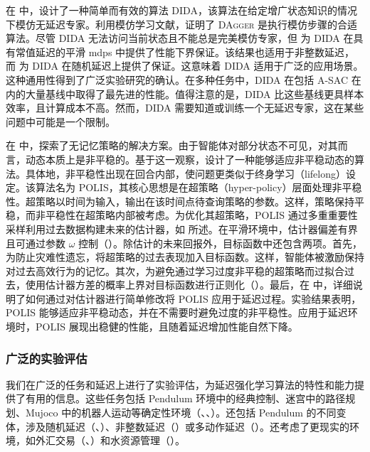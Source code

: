 在  中，设计了一种简单而有效的算法 DIDA，该算法在给定增广状态知识的情况下模仿无延迟专家。利用模仿学习文献，证明了 \textsc{DAgger} 是执行模仿步骤的合适算法。尽管 DIDA 无法访问当前状态且不能总是完美模仿专家，但  为 DIDA 在具有常值延迟的平滑 \glspl{mdp} 中提供了性能下界保证。该结果也适用于非整数延迟，而  为 DIDA 在随机延迟上提供了保证。这意味着 DIDA 适用于广泛的应用场景。这种通用性得到了广泛实验研究的确认。在多种任务中，DIDA 在包括 A-SAC 在内的大量基线中取得了最先进的性能。值得注意的是，DIDA 比这些基线更具样本效率，且计算成本不高。然而，DIDA 需要知道或训练一个无延迟专家，这在某些问题中可能是一个限制。

在  中，探索了无记忆策略的解决方案。由于智能体对部分状态不可见，对其而言，动态本质上是非平稳的。基于这一观察，设计了一种能够适应非平稳动态的算法。具体地，非平稳性出现在回合内部，使问题更类似于终身学习（lifelong）设定。该算法名为 POLIS，其核心思想是在超策略（hyper-policy）层面处理非平稳性。超策略以时间为输入，输出在该时间点待查询策略的参数。这样，策略保持平稳，而非平稳性在超策略内部被考虑。为优化其超策略，POLIS 通过多重重要性采样利用过去数据构建未来的估计器，如  所述。在平滑环境中，估计器偏差有界且可通过参数 $\omega$ 控制（）。除估计的未来回报外，目标函数中还包含两项。首先，为防止灾难性遗忘，将超策略的过去表现加入目标函数。这样，智能体被激励保持对过去高效行为的记忆。其次，为避免通过学习过度非平稳的超策略而过拟合过去，使用估计器方差的概率上界对目标函数进行正则化（）。最后，在  中，详细说明了如何通过对估计器进行简单修改将 POLIS 应用于延迟过程。实验结果表明，POLIS 能够适应非平稳动态，并在不需要时避免过度的非平稳性。应用于延迟环境时，POLIS 展现出稳健的性能，且随着延迟增加性能自然下降。

\subsubsection{广泛的实验评估}
我们在广泛的任务和延迟上进行了实验评估，为延迟强化学习算法的特性和能力提供了有用的信息。这些任务包括 Pendulum 环境中的经典控制、迷宫中的路径规划、Mujoco 中的机器人运动等确定性环境（、、）。还包括 Pendulum 的不同变体，涉及随机延迟（、）、非整数延迟（）或多动作延迟（）。还考虑了更现实的环境，如外汇交易（、）和水资源管理（）。

